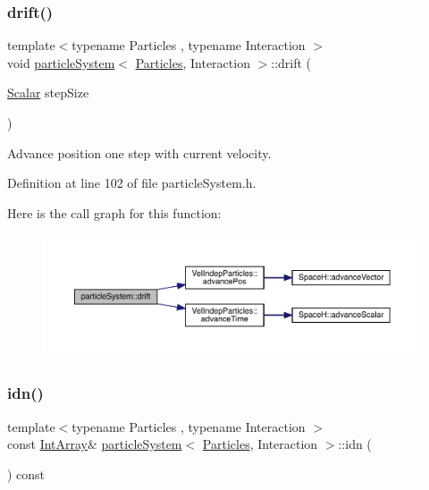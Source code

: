 \mbox{\label{classparticle_system_a3f88bac7a0941910cbffe4ec6b1f32ec}} 
\subsubsection{\texorpdfstring{drift()}{drift()}}
{\footnotesize\ttfamily template$<$typename Particles , typename Interaction $>$ \\
void \mbox{\hyperlink{classparticle_system}{particle\+System}}$<$ \mbox{\hyperlink{struct_particles}{Particles}}, Interaction $>$\+::drift (\begin{DoxyParamCaption}\item[{\mbox{\hyperlink{classparticle_system_a3938954186247e3eab01cc75fcc62b40}{Scalar}}}]{step\+Size }\end{DoxyParamCaption})\hspace{0.3cm}{\ttfamily [inline]}}



Advance position one step with current velocity. 



Definition at line 102 of file particle\+System.\+h.

Here is the call graph for this function\+:\nopagebreak
\begin{figure}[H]
\begin{center}
\leavevmode
\includegraphics[width=350pt]{classparticle_system_a3f88bac7a0941910cbffe4ec6b1f32ec_cgraph}
\end{center}
\end{figure}
\mbox{\label{classparticle_system_a551d6833ec7b1f42a0d2c6b8ad0b3ddb}} 
\subsubsection{\texorpdfstring{idn()}{idn()}\hspace{0.1cm}{\footnotesize\ttfamily [1/2]}}
{\footnotesize\ttfamily template$<$typename Particles , typename Interaction $>$ \\
const \mbox{\hyperlink{classparticle_system_aea9c70dc1a9d1947b425f5383fb21e24}{Int\+Array}}\& \mbox{\hyperlink{classparticle_system}{particle\+System}}$<$ \mbox{\hyperlink{struct_particles}{Particles}}, Interaction $>$\+::idn (\begin{DoxyParamCaption}{ }\end{DoxyParamCaption}) const\hspace{0.3cm}{\ttfamily [inline]}}



